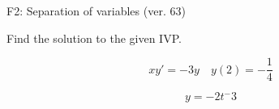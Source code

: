 \begin{exercise}
  \begin{exerciseTitle}F2: Separation of variables (ver. 63)\end{exerciseTitle}
  \begin{exerciseStatement}
    
Find the solution to the given IVP.

    
\[xy'= -3 y \hspace{1em} y( 2 ) = -\frac{1}{4}\]

  \end{exerciseStatement}
  \begin{exerciseAnswer}
    
\[y= -2 t^ -3\]

  \end{exerciseAnswer}
\end{exercise}
